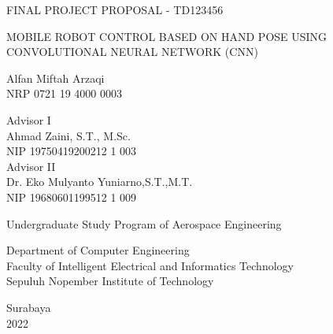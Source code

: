 \begin{large}
  FINAL PROJECT PROPOSAL - TD123456
\end{large}

\vspace{\fill}

\begin{spacing}{1.5}
  \begin{Large}
    MOBILE ROBOT CONTROL BASED ON HAND POSE USING CONVOLUTIONAL NEURAL NETWORK (CNN)
  \end{Large}
\end{spacing}

\vspace{\fill}

\begin{large}
  Alfan Miftah Arzaqi \\
  \textnormal{NRP 0721 19 4000 0003}
\end{large}

\vspace{\fill}

\begin{large}
  \textnormal{Advisor I} \\
  Ahmad Zaini, S.T., M.Sc. \\
  \textnormal{NIP 19750419200212 1 003} \\
  \textnormal{Advisor II} \\
  Dr. Eko Mulyanto Yuniarno,S.T.,M.T. \\
  \textnormal{NIP 19680601199512 1 009}
\end{large}

\vspace{\fill}

Undergraduate Study Program of Aerospace Engineering \\

\normalfont

Department of Computer Engineering \\
Faculty of Intelligent Electrical and Informatics Technology\\
Sepuluh Nopember Institute of Technology

Surabaya \\
2022

